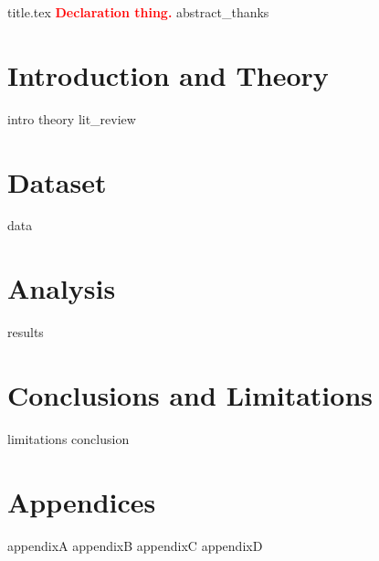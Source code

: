 \documentclass[openany,a4paper,12pt]{book}
\begin{document}
\pagestyle{headings}
\pagestyle{fancy}
\fancyfoot[R]{\thepage}

\frontmatter
{title.tex}
\clearpage
\textcolor{red}{\textbf{Declaration thing.}}
{abstract_thanks}
\tableofcontents

\newpage
\thispagestyle{empty}
\listoftables
\listoffigures



\mainmatter %

\chapter{Introduction and Theory} %
{intro} %
{theory} %
{lit_review} %


\chapter{Dataset} %
\label{sec:Dataset}
{data}

\chapter{Analysis} %
\label{sec:Analysis}
{results}

\chapter{Conclusions and Limitations} %
{limitations} %
{conclusion} %
\label{sec:Bibliography}

\label{sec:appendices}
\chapter{Appendices}
{appendixA}
\newpage
{appendixB}
\newpage
{appendixC}
\newpage
{appendixD}

%

\backmatter


\printglossary[type=\acronymtype, nonumberlist]
\end{document}
